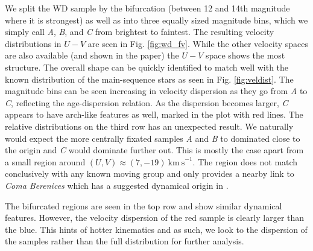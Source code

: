 We split the WD sample by the bifurcation (between 12 and 14th magnitude where it is strongest) as well as into three equally sized magnitude bins, which we simply call \textit{A}, \textit{B}, and \textit{C} from brightest to faintest. The resulting velocity distributions in $U-V$ are seen in Fig. \ref{fig:wd_fv}. While the other velocity spaces are also available (and shown in the paper) the $U-V$ space shows the most structure. The overall shape can be quickly identified to match well with the known distribution of the main-sequence stars as seen in Fig. \ref{fig:veldist}. The magnitude bins can be seen increasing in velocity dispersion as they go from \textit{A} to \textit{C}, reflecting the age-dispersion relation. As the dispersion becomes larger, \textit{C} appears to have arch-like features as well, marked in the plot with red lines. The relative distributions on the third row has an unexpected result. We naturally would expect the more centrally fixated samples \textit{A} and \textit{B} to dominated close to the origin and \textit{C} would dominate further out. This is mostly the case apart from a small region around $(U, V) \approx (7, -19)\ \mathrm{km\ s}^{-1}$. The region does not match conclusively with any known moving group and only \cite{kushniruk:17} provides a nearby link to \textit{Coma Berenices} which has a suggested dynamical origin in \cite{monari:18}. 

The bifurcated regions are seen in the top row and show similar dynamical features. However, the velocity dispersion of the red sample is clearly larger than the blue. This hints of hotter kinematics and as such, we look to the dispersion of the samples rather than the full distribution for further analysis. 
